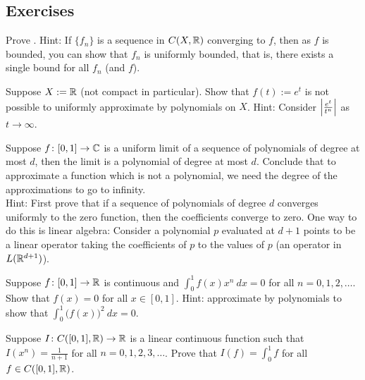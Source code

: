 \subsection{Exercises}

\begin{exercise}
Prove .
Hint: If $\{ f_n \}$ is a sequence in $C(X,{\mathbb{R}})$
converging to $f$, then as $f$ is bounded, you can show
that $f_n$ is uniformly bounded, that is, there exists a
single bound for all $f_n$ (and $f$).
\end{exercise}

\begin{exercise}
Suppose $X := {\mathbb{R}}$ (not compact in particular).
Show that $f(t) := e^t$ is not possible to uniformly approximate
by polynomials on $X$.  Hint: Consider $\left\lvert {\frac{e^t}{t^n}} \right\rvert$
as $t \to \infty$.
\end{exercise}

\begin{exercise}
Suppose $f \colon [0,1] \to {\mathbb{C}}$ is a uniform limit of a sequence of polynomials
of degree at most $d$, then the limit is a polynomial of degree at most $d$.
Conclude that to approximate a function which is not a polynomial, we
need the degree of the approximations to go to infinity.\\
Hint: First prove that if a sequence of polynomials of degree $d$
converges uniformly to the zero function, then 
the coefficients converge to zero.
One way to do this is linear algebra: Consider a polynomial $p$
evaluated at $d+1$ points
to be a linear operator taking the
coefficients of $p$ to the values of $p$
(an operator in $L({\mathbb{R}}^{d+1})$).
\end{exercise}

\begin{exercise}
Suppose $f \colon [0,1] \to {\mathbb{R}}$ is continuous and
$\int_0^1 f(x) x^n ~dx = 0$ for all $n = 0,1,2,\ldots$.
Show that $f(x) = 0$ for all $x \in [0,1]$.
Hint: approximate by polynomials to show that $\int_0^1 {\bigl( f(x)
\bigr)}^2 ~ dx = 0$.
\end{exercise}

\begin{exercise}
Suppose $I \colon C([0,1],{\mathbb{R}}) \to {\mathbb{R}}$ is 
a linear continuous function such that
$I(x^n) = \frac{1}{n+1}$
for all $n=0,1,2,3,\ldots$.
Prove that $I(f) = \int_0^1 f$ for all $f \in C([0,1],{\mathbb{R}})$.
\end{exercise}

